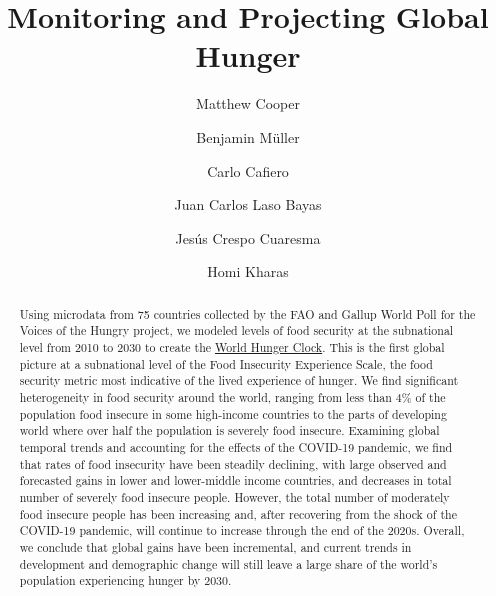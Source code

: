 \documentclass{article}
\begin{document}
\title{Monitoring and Projecting Global Hunger}

\author[1,2,*]{Matthew Cooper}
\author[2,3]{Benjamin Müller}
\author[4]{Carlo Cafiero}
\author[2,5]{Juan Carlos Laso Bayas}
\author[5,6]{Jesús Crespo Cuaresma}
\author[2,7]{Homi Kharas}


\maketitle
\begin{abstract}
Using microdata from 75 countries collected by the FAO and Gallup World Poll for the Voices of the Hungry project, we modeled levels of food security at the subnational level from 2010 to 2030 to create the \href{https://worldhunger.io}{World Hunger Clock}.  This is the first global picture at a subnational level of the Food Insecurity Experience Scale, the food security metric most indicative of the lived experience of hunger.  We find significant heterogeneity in food security around the world, ranging from less than 4\% of the population food insecure in some high-income countries to the parts of developing world where over half the population is severely food insecure.  Examining global temporal trends and accounting for the effects of the COVID-19 pandemic, we find that rates of food insecurity have been steadily declining, with large observed and forecasted gains in lower and lower-middle income countries, and decreases in total number of severely food insecure people.  However, the total number of moderately food insecure people has been increasing and, after recovering from the shock of the COVID-19 pandemic, will continue to increase through the end of the 2020s.  Overall, we conclude that global gains have been incremental, and current trends in development and demographic change will still leave a large share of the world's population experiencing hunger by 2030.  \end{abstract}
\end{document}
